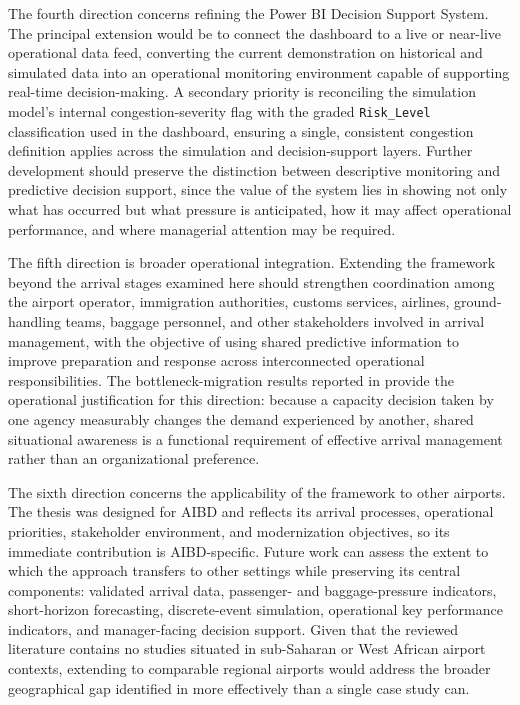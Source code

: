 The fourth direction concerns refining the Power BI Decision Support System. The principal extension would be to connect the dashboard to a live or near-live operational data feed, converting the current demonstration on historical and simulated data into an operational monitoring environment capable of supporting real-time decision-making. A secondary priority is reconciling the simulation model’s internal congestion-severity flag with the graded \nolinkurl{Risk_Level} classification used in the dashboard, ensuring a single, consistent congestion definition applies across the simulation and decision-support layers. Further development should preserve the distinction between descriptive monitoring and predictive decision support, since the value of the system lies in showing not only what has occurred but what pressure is anticipated, how it may affect operational performance, and where managerial attention may be required.

The fifth direction is broader operational integration. Extending the framework beyond the arrival stages examined here should strengthen coordination among the airport operator, immigration authorities, customs services, airlines, ground-handling teams, baggage personnel, and other stakeholders involved in arrival management, with the objective of using shared predictive information to improve preparation and response across interconnected operational responsibilities. The bottleneck-migration results reported in  provide the operational justification for this direction: because a capacity decision taken by one agency measurably changes the demand experienced by another, shared situational awareness is a functional requirement of effective arrival management rather than an organizational preference.

The sixth direction concerns the applicability of the framework to other airports. The thesis was designed for AIBD and reflects its arrival processes, operational priorities, stakeholder environment, and modernization objectives, so its immediate contribution is AIBD-specific. Future work can assess the extent to which the approach transfers to other settings while preserving its central components: validated arrival data, passenger- and baggage-pressure indicators, short-horizon forecasting, discrete-event simulation, operational key performance indicators, and manager-facing decision support. Given that the reviewed literature contains no studies situated in sub-Saharan or West African airport contexts, extending to comparable regional airports would address the broader geographical gap identified in  more effectively than a single case study can.

